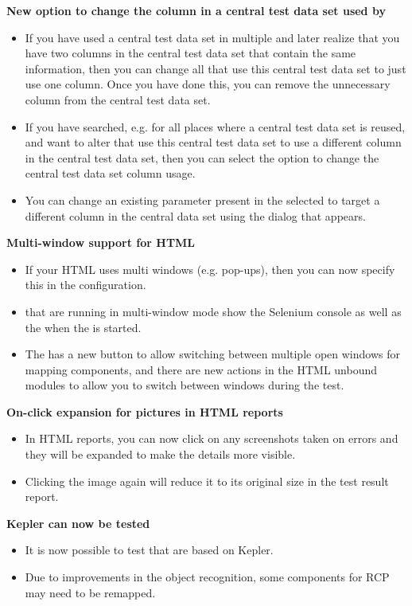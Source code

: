 \textbf{New option to change the column in a central test data set used by \gdcases{}}
\begin{itemize} 
\item If you have used a central test data set in multiple \gdcases{} and later realize that you have two columns in the central test data set that contain the same information, then you can change all \gdcases{} that use this central test data set to just use one column. Once you have done this, you can remove the unnecessary column from the central test data set.   
\item If you have searched, e.g. for all places where a central test data set is reused, and want to alter \gdcases{} that use this central test data set to use a different column in the central test data set, then you can select the option to change the central test data set column usage.
\item You can change an existing parameter present in the selected \gdcases{} to target a different column in the central data set using the dialog that appears.  
\end{itemize}


\textbf{Multi-window support for HTML \gdauts{}}
\begin{itemize}
\item If your HTML \gdaut{} uses multi windows (e.g. pop-ups), then you can now specify this in the \gdaut{} configuration. 
\item \gdauts{} that are running in multi-window mode show the Selenium console as well as the \gdaut{} when the \gdaut{} is started. 
\item The \gdomeditor{} has a new button to allow switching between multiple open windows for mapping components, and there are new actions in the HTML unbound modules to allow you to switch between windows during the test. 
\end{itemize}

\textbf{On-click expansion for pictures in HTML reports}
\begin{itemize}
\item In HTML reports, you can now click on any screenshots taken on errors and they will be expanded to make the details more visible.
\item Clicking the image again will reduce it to its original size in the test result report.
\end{itemize}

\textbf{Kepler \gdauts{} can now be tested}
\begin{itemize}
\item It is now possible to test \gdauts{} that are based on Kepler.
\item Due to improvements in the object recognition, some components for RCP \gdauts{} may need to be remapped.
\end{itemize}

